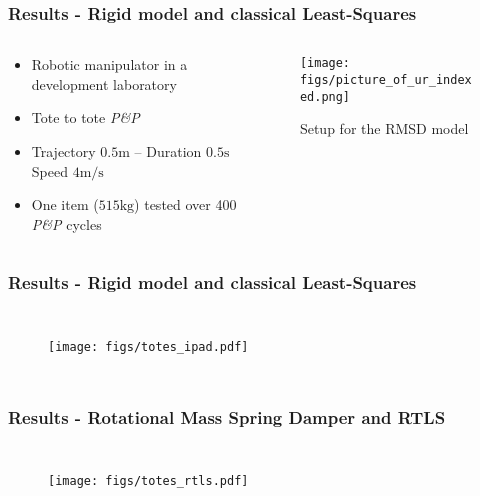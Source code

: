 \documentclass[aspectratio=1610]{beamer}
\begin{document}
\begin{frame}
\frametitle{Results - Rigid model and classical Least-Squares}
\begin{columns}
\begin{column}{0.5\textwidth}
  \begin{itemize}\itemsep1em
    \justifying
    \item Robotic manipulator in a development laboratory
    \item Tote to tote \textit{P\&P}
    \item \textcolor{Ocean}{Trajectory} $0.5 \si{\meter}$ – \textcolor{Ocean}{Duration} $0.5 \si{\second}$ \\
    \textcolor{Ocean}{Speed} $4 \si{\meter\per\second}$
    \item One item ($515 \si{\kilogram}$) tested over 400 \textit{P\&P} cycles
  \end{itemize}
\end{column}
\begin{column}{0.5\textwidth}  %
  \begin{figure}
    \centering
    \texttt{[image: figs/picture\_of\_ur\_indexed.png]}
    \caption{Setup for the RMSD model}
  \end{figure}
\end{column}
\end{columns}

\end{frame}


\begin{frame}
\frametitle{Results - Rigid model and classical Least-Squares}
\begin{columns}
  \column{37em}
  \begin{figure}
    \centering
    \texttt{[image: figs/totes\_ipad.pdf]}
  \end{figure}
\end{columns}
\end{frame}


\begin{frame}
\frametitle{Results - Rotational Mass Spring Damper and RTLS}
\begin{columns}
  \column{37em}
  \begin{figure}
    \centering
    \texttt{[image: figs/totes\_rtls.pdf]}
  \end{figure}
\end{columns}
\end{frame}
\end{document}
